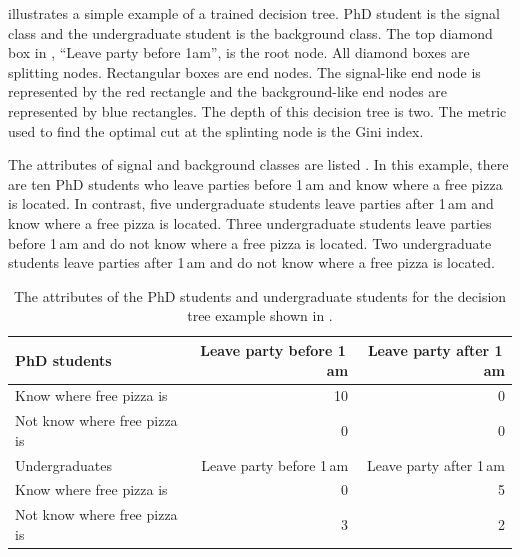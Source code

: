  illustrates a simple example of a trained decision tree. PhD student is the signal class and the undergraduate student is the background class. The top diamond box in ,   ``Leave party  before  1am'', is the root node. All diamond boxes are splitting nodes. Rectangular boxes are end nodes.  The signal-like end node is represented by the red rectangle and the background-like end nodes are represented by blue rectangles. The depth of this decision tree is two. The metric used to find the optimal cut at the splinting node is the Gini index.


The attributes of signal and background classes are listed . In this example, there are ten PhD students who leave parties before 1\,am and know where a free pizza is located. In contrast, five undergraduate students leave parties after 1\,am and know where a free pizza is located. Three undergraduate students leave parties before 1\,am and do not know where a free pizza is located. Two undergraduate students leave parties after 1\,am and do not know where a free pizza is located.


\begin{table}[!htbp]\centering

\begin{tabular}{lrr}
\hline \hline
PhD students & Leave party before 1\,am  & Leave party after 1\,am\\
\hline
Know where free pizza is & 10 & 0 \\
Not know where free pizza is & 0 & 0 \\
\hline
Undergraduates & Leave party before 1\,am  & Leave party after 1\,am\\
\hline
Know where free pizza is & 0 & 5 \\
Not know where free pizza is & 3 & 2 \\
\hline \hline
\end{tabular}
\caption
{The attributes of  the PhD students and undergraduate students for the decision tree example shown in .}
\label{tab:doubleHiggsDecisionTreeComic2}
\end{table}

